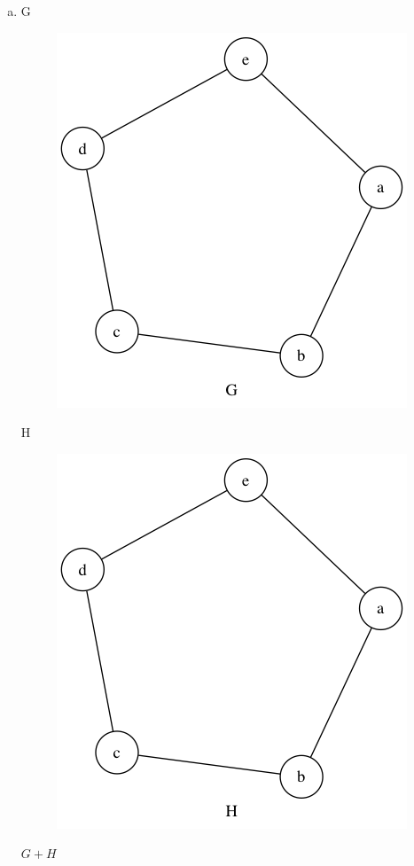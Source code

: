 \begin{enumerate}[(a)]
    \item G 
    \begin{figure}[H]
    \centering
    \includegraphics[scale=0.5]{115/115cG.png}
    \end{figure}
    H
    \begin{figure}[H]
    \centering
    \includegraphics[scale=0.5]{115/115cH.png}
    \end{figure}
    $G+H$
    \begin{figure}[H]
    \centering

\end{figure}
\end{enumerate}
